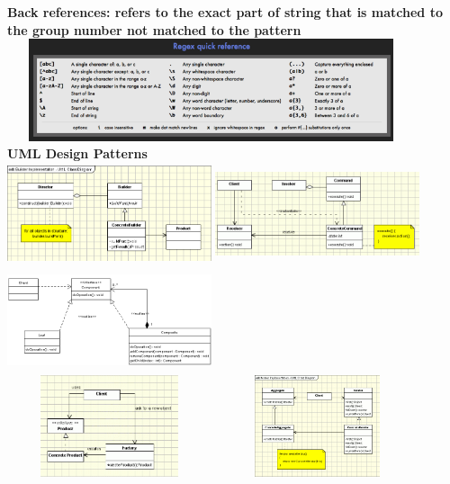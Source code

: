 \documentclass{article}
\begin{document}
\textbf{Back references: refers to the exact part of string that is matched to the group number not matched to the pattern \\}
\includegraphics[width=12cm,height =3cm]{regexTable.jpg}\\
\textbf{UML Design Patterns}\\
\includegraphics[width=6cm,height =3cm]{Builder.png}
\includegraphics[width=6cm,height =3cm]{command.png}
\includegraphics[width=6cm,height =3cm]{Composite.png}\\
\includegraphics[width=6cm,height =3cm]{Factory.png}
\includegraphics[width=6cm,height =3cm]{it.png}
\end{document}
